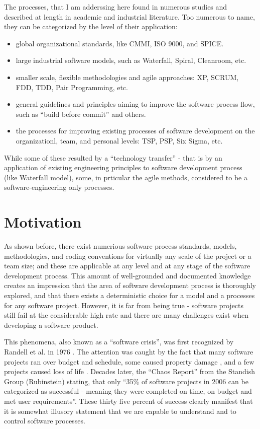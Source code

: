 The processes, that I am adderssing here found in numerous studies and described at length in 
academic and industrial literature. Too numerous to name, they can be categorized by the level 
of their application:
\begin{itemize}
 \item global organizational standards, like CMMI, ISO 9000, and SPICE. 
 \item large industrial software models, such as Waterfall, Spiral, Cleanroom, etc.
 \item smaller scale, flexible methodologies and agile approaches: XP, SCRUM, FDD, 
TDD, Pair Programming, etc.
 \item general guidelines and principles aiming to improve the software process flow, 
such as ``build before commit'' and others.
 \item the processes for improving existing processes of software development 
on the organizationl, team, and personal levels: TSP, PSP, Six Sigma, etc.
\end{itemize}
While some of these resulted by a ``technology transfer'' - that is by an application of existing 
engineering principles to software development process (like Waterfall model), some, in prticular 
the agile methods, considered to be a software-engineering only processes. 

\section{Motivation}
As shown before, there exist numerious software process standards, models, methodologies, 
and coding conventions for virtually any scale of the project or a team size; and these are
applicable at any level and at any stage of the software development process. This amount of 
well-grounded and documented knowledge creates an impression that the area of software development 
process is thoroughly explored, and that there exists a deterministic choice for a model and a 
processes for any software project. However, it is far from being true - software projects still fail 
at the considerable high rate and there are many challenges exist when developing a software product.

This phenomena, also known as a ``software crisis'', was first recognized by Randell et al. in 1976 
\cite{naur1976software}. The attention was caught by the fact that many software projects ran 
over budget and schedule, some caused property damage \cite{citeulike:11044022}, and a few projects caused 
loss of life \cite{citeulike:712058}. Decades later, the ``Chaos Report'' from the Standish 
Group (Rubinstein) \cite{SDTimes} stating, that only ``35\% of software projects in 2006 can 
be categorized as successful - meaning they were completed on time, on budget and met 
user requirements''. These thirty five percent of success clearly manifest that it is somewhat 
illusory statement that we are capable to understand and to control software processes.

